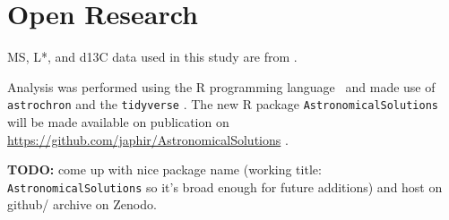\documentclass[draft]{agujournal2019}
\begin{document}
\section*{Open Research}

\Gls{MS}, \gls{L*}, and \gls{d13C} data used in this study are from .

Analysis was performed using the R programming language~\cite{RCoreTeam2020} and made use of \texttt{astrochron}  and the \texttt{tidyverse} .
The new R package \texttt{AstronomicalSolutions} will be made available on publication on \url{https://github.com/japhir/AstronomicalSolutions} .

\textbf{TODO:} come up with nice package name (working title: \texttt{AstronomicalSolutions} so it's broad enough for future additions) and host on github/ archive on Zenodo.






\end{document}
